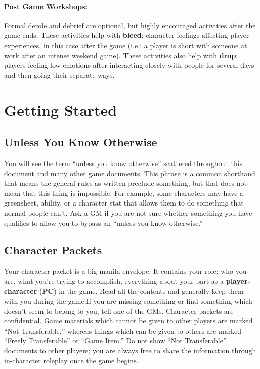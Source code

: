 \documentclass[sheet]{GL2020}
\begin{document}
\paragraph{Post Game Workshops:} Formal derole and debrief are optional, but highly encouraged activities after the game ends. These activities help with \textbf{bleed}: character feelings affecting player experiences, in this case after the game (i.e.: a player is short with someone at work after an intense weekend game). These activities also help with \textbf{drop}: players feeling low emotions after interacting closely with people for several days and then going their separate ways.

\section{Getting Started}
\subsection{Unless You Know Otherwise}
You will see the term ``unless you know otherwise'' scattered throughout this document and many other game documents. This phrase is a common shorthand that means the general rules as written preclude something, but that does not mean that this thing is impossible. For example, some characters may have a greensheet, ability, or a character stat that allows them to do something that normal people can't. Ask a GM if you are not sure whether something you have qualifies to allow you to bypass an ``unless you know otherwise.''

\subsection{Character Packets}

Your character packet is a big manila envelope. It contains your role: who you are, what you're trying to accomplish; everything about your part as a {\bf player-character} ({\bf PC}) in the game. Read all the contents and generally keep them with you during the game.If you are missing something or find something which doesn't seem to belong to you, tell one of the GMs. Character packets are confidential. Game materials which cannot be given to other players are marked ``Not Transferable,'' whereas things which can be given to others are marked ``Freely Transferable'' or ``Game Item.'' Do not show ``Not Transferable'' documents to other players; you are always free to share the information through in-character roleplay once the game begins.
\end{document}
